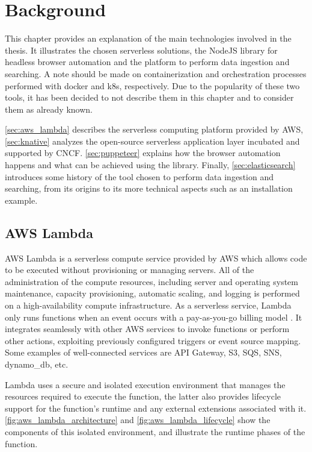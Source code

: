 \documentclass[../thesis.tex]{subfiles}
\begin{document}
\chapter{Background}\label{cap:background}
This chapter provides an explanation of the main technologies involved in the thesis. It illustrates the chosen serverless solutions, the NodeJS library for headless browser automation and the platform to perform data ingestion and searching. A note should be made on containerization and orchestration processes performed with \gls{docker} and \gls{k8s}, respectively. Due to the popularity of these two tools, it has been decided to not describe them in this chapter and to consider them as already known.

\autoref{sec:aws_lambda} describes the serverless computing platform provided by \acrshort{AWS}, \autoref{sec:knative} analyzes the open-source serverless application layer incubated and supported by \acrshort{CNCF}. \autoref{sec:puppeteer} explains how the browser automation happens and what can be achieved using the library. Finally, \autoref{sec:elasticsearch} introduces some history of the tool chosen to perform data ingestion and searching, from its origins to its more technical aspects such as an installation example.

\section{AWS Lambda}\label{sec:aws_lambda}
\acrshort{AWS} Lambda is a serverless compute service provided by \acrlong{AWS} which allows code to be executed without provisioning or managing servers. All of the administration of the compute resources, including server and operating system maintenance, capacity provisioning, automatic scaling, and logging is performed on a high-availability compute infrastructure. As a serverless service, Lambda only runs functions when an event occurs with a pay-as-you-go billing model \cite{site:aws_lambda_doc}. It integrates seamlessly with other \acrshort{AWS} services to invoke functions or perform other actions, exploiting previously configured triggers or event source mapping. Some examples of well-connected services are API Gateway, \acrshort{S3}, \acrshort{SQS}, \acrshort{SNS}, \gls{dynamo_db}, etc. 

Lambda uses a secure and isolated execution environment that manages the resources required to execute the function, the latter also provides lifecycle support for the function's runtime and any external extensions associated with it. \autoref{fig:aws_lambda_architecture} and \ref{fig:aws_lambda_lifecycle} show the components of this isolated environment, and illustrate the runtime phases of the function.
\end{document}
